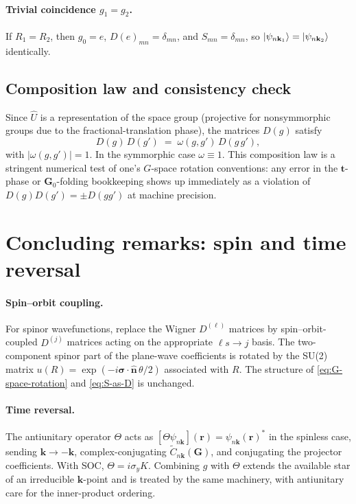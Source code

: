 \documentclass[11pt,a4paper]{article}
\newcommand{\rr}{\mathbf{r}}
\newcommand{\kk}{\mathbf{k}}
\newcommand{\GG}{\mathbf{G}}
\newcommand{\tvec}{\mathbf{t}}
\newcommand{\Uhat}{\hat{U}}
\begin{document}
\paragraph{Trivial coincidence $g_1 = g_2$.} If $R_1 = R_2$, then $g_0 = e$,
$D(e)_{mn} = \delta_{mn}$, and $S_{mn} = \delta_{mn}$, so
$\ket{\psi_{n\kk_1}} = \ket{\psi_{n\kk_2}}$ identically.

\subsection{Composition law and consistency check}

Since $\Uhat$ is a representation of the space group (projective for
nonsymmorphic groups due to the fractional-translation phase), the matrices
$D(g)$ satisfy
\begin{equation}
D(g)\,D(g') \;=\; \omega(g,g')\,D(g\,g'),
\end{equation}
with $|\omega(g,g')|=1$. In the symmorphic case $\omega \equiv 1$. This
composition law is a stringent numerical test of one's $G$-space rotation
conventions: any error in the $\tvec$-phase or $\GG_0$-folding bookkeeping shows
up immediately as a violation of $D(g)D(g') = \pm D(gg')$ at machine
precision.

\section{Concluding remarks: spin and time reversal}

\paragraph{Spin--orbit coupling.} For spinor wavefunctions, replace the
Wigner $D^{(\ell)}$ matrices by spin--orbit-coupled $D^{(j)}$ matrices acting
on the appropriate $\ell s\to j$ basis. The two-component spinor part of the
plane-wave coefficients is rotated by the SU(2) matrix $u(R) =
\exp(-i\boldsymbol\sigma\cdot\hat{\mathbf{n}}\,\theta/2)$ associated with $R$.
The structure of \eqref{eq:G-space-rotation} and \eqref{eq:S-as-D} is
unchanged.

\paragraph{Time reversal.} The antiunitary operator $\Theta$ acts as
$[\Theta\psi_{n\kk}](\rr) = \psi_{n\kk}(\rr)^*$ in the spinless case, sending
$\kk \to -\kk$, complex-conjugating $\tilde C_{n\kk}(\GG)$, and conjugating
the projector coefficients. With SOC, $\Theta = i\sigma_y K$. Combining $g$
with $\Theta$ extends the available star of an irreducible $\kk$-point and is
treated by the same machinery, with antiunitary care for the inner-product
ordering.
\end{document}
